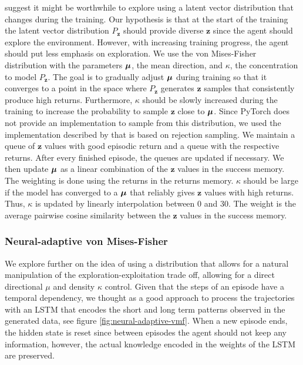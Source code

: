 \documentclass[10pt]{article} %
\begin{document}
\cite{rle-paper} suggest it might be worthwhile to explore using a latent vector distribution that changes during the training. Our hypothesis is that at the start of the training the latent vector distribution $P_{\textbf{z}}$ should provide diverse $\textbf{z}$ since the agent should explore the environment. However, with increasing training progress, the agent should put less emphasis on exploration. We use the von Mises-Fisher distribution with the parameters ${\bm{\mu}}$, the mean direction, and $\kappa$, the concentration to model $P_{\textbf{z}}$. The goal is to gradually adjust ${\bm{\mu}}$ during training so that it converges to a point in the space where $P_{\textbf{z}}$ generates $\mathbf{z}$ samples that consistently produce high returns. Furthermore, $\kappa$ should be slowly increased during the training to increase the probability to sample $\mathbf{z}$ close to ${\bm{\mu}}$. Since PyTorch does not provide an implementation to sample from this distribution, we used the implementation described by \cite{von-mises-fisher-paper} that is based on rejection sampling. We maintain a queue of $\textbf{z}$ values with good episodic return and a queue with the respective returns. After every finished episode, the queues are updated if necessary. We then update ${\bm{\mu}}$ as a linear combination of the $\textbf{z}$ values in the success memory. The weighting is done using the returns in the returns memory. $\kappa$ should be large if the model has converged to a ${\bm{\mu}}$ that reliably gives $\textbf{z}$ values with high returns. Thus, $\kappa$ is updated by linearly interpolation between $0$ and $30$. The weight is the average pairwise cosine similarity between the $\textbf{z}$ values in the success memory.

\vspace{-1pt}
\subsubsection{Neural-adaptive von Mises-Fisher}

We explore further on the idea of using a distribution that allows for a natural manipulation of the exploration-exploitation trade off, allowing for a direct directional \textbf{$\mu$} and density \textbf{$\kappa$} control. Given that the steps of an episode have a temporal dependency, we thought as a good approach to process the trajectories with an LSTM that encodes the short and long term patterns observed in the generated data, see figure \ref{fig:neural-adaptive-vmf}. When a new episode ends, the hidden state is reset since between episodes the agent should not keep any information, however, the actual knowledge encoded in the weights of the LSTM are preserved. 
\end{document}
